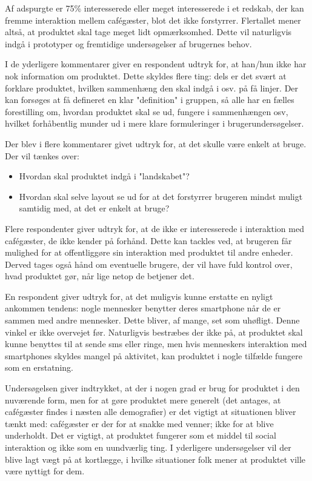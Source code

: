 \documentclass{article}
\begin{document}
    Af adspurgte er 75\% interesserede eller meget interesserede i et redskab, der kan fremme interaktion mellem cafégæster, blot det ikke forstyrrer. Flertallet mener altså, at produktet skal tage meget lidt opmærksomhed. Dette vil naturligvis indgå i prototyper og fremtidige undersøgelser af brugernes behov.
    
    I de yderligere kommentarer giver en respondent udtryk for, at han/hun ikke har nok information om produktet. Dette skyldes flere ting: dels er det svært at forklare produktet, hvilken sammenhæng den skal indgå i osv. på få linjer. Der kan forsøges at få defineret en klar "definition" i gruppen, så alle har en fælles forestilling om, hvordan produktet skal se ud, fungere i sammenhængen osv, hvilket forhåbentlig munder ud i mere klare formuleringer i brugerundersøgelser.
    
    Der blev i flere kommentarer givet udtryk for, at det skulle være enkelt at bruge. Der vil tænkes over:
        \begin{itemize}
            \item Hvordan skal produktet indgå i "landskabet"?
            \item Hvordan skal selve layout se ud for at det forstyrrer brugeren mindst muligt samtidig med, at det er enkelt at bruge?
            
        \end{itemize}
    Flere respondenter giver udtryk for, at de ikke er interesserede i interaktion med cafégæster, de ikke kender på forhånd. Dette kan tackles ved, at brugeren får mulighed for at offentliggøre sin interaktion med produktet til andre enheder. Derved tages også hånd om eventuelle brugere, der vil have fuld kontrol over, hvad produktet gør, når lige netop de betjener det.
    
    En respondent giver udtryk for, at det muligvis kunne erstatte en nyligt ankommen tendens: nogle mennesker benytter deres smartphone når de er sammen med andre mennesker. Dette bliver, af mange, set som uhøfligt. Denne vinkel er ikke overvejet før. Naturligvis bestræbes der ikke på, at produktet skal kunne benyttes til at sende sms eller ringe, men hvis menneskers interaktion med smartphones skyldes mangel på aktivitet, kan produktet i nogle tilfælde fungere som en erstatning.
    
    Undersøgelsen giver indtrykket, at der i nogen grad er brug for produktet i den nuværende form, men for at gøre produktet mere generelt (det antages, at cafégæster findes i næsten alle demografier) er det vigtigt at situationen bliver tænkt med: cafégæster er der for at snakke med venner; ikke for at blive underholdt. Det er vigtigt, at produktet fungerer som et middel til social interaktion og ikke som en uundværlig ting. I yderligere undersøgelser vil der blive lagt vægt på at kortlægge, i hvilke situationer folk mener at produktet ville være nyttigt for dem.
\end{document}
